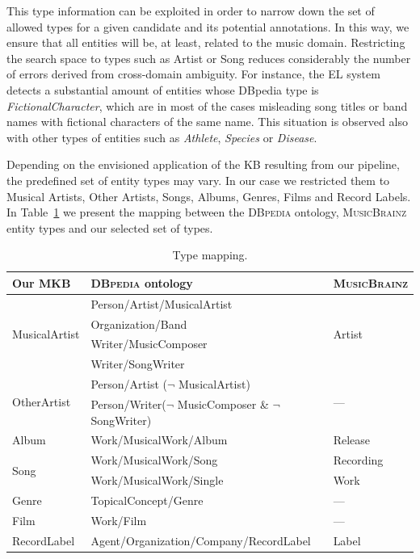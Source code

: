 This type information can be exploited in order to narrow down the set of allowed types for a given candidate and its potential annotations. In this way, we ensure that all entities will be, at least, related to the music domain. Restricting the search space to types such as Artist or Song reduces considerably the number of errors derived from cross-domain ambiguity. For instance, the EL system detects a substantial amount of entities whose DBpedia type is \textit{FictionalCharacter}, which are in most of the cases misleading song titles or band names with fictional characters of the same name. This situation is observed also with other types of entities such as \textit{Athlete}, \textit{Species} or \textit{Disease}.

Depending on the envisioned application of the \textsc{KB} resulting from our pipeline, the predefined set of entity types may vary. In our case we restricted them to Musical Artists, Other Artists, Songs, Albums, Genres, Films and Record Labels. In Table~\ref{tbl:kb:type_mapping} we present the mapping between the \textsc{DBpedia} ontology, \textsc{MusicBrainz} entity types and our selected set of types.

\begin{table}[ht!]
\scriptsize
\centering
	\begin{tabular}{ | l | l | l | }
	\hline
\textbf{Our \textsc{MKB}} & \textbf{\textsc{DBpedia} ontology} & \textbf{\textsc{MusicBrainz}} \\
	\hline
\multirow{4}{*}{MusicalArtist} & Person/Artist/MusicalArtist & \multirow{4}{*}{Artist}\\ 
& Organization/Band & \\ 
& Writer/MusicComposer & \\ 
& Writer/SongWriter & \\
	\hline
\multirow{2}{*}{OtherArtist} & Person/Artist ($\neg$ MusicalArtist) & \multirow{2}{*}{---} \\
& Person/Writer($\neg$ MusicComposer \& $\neg$ SongWriter) & \\
    \hline
Album & Work/MusicalWork/Album & Release \\
    \hline
\multirow{2}{*}{Song} & Work/MusicalWork/Song & Recording \\
& Work/MusicalWork/Single & Work \\
    \hline
Genre & TopicalConcept/Genre & --- \\
    \hline
Film & Work/Film & --- \\
    \hline
RecordLabel & Agent/Organization/Company/RecordLabel & Label \\
    \hline
	\end{tabular}
	\caption{Type mapping.}
	\label{tbl:kb:type_mapping}
\end{table}
%

